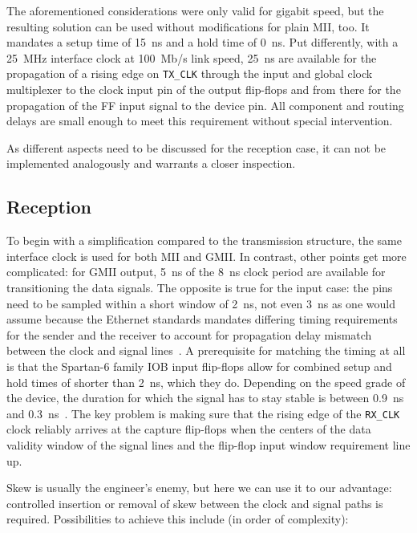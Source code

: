 \documentclass[a4paper, 11pt, oneside]{Thesis}  %
\begin{document}
The aforementioned considerations were only valid for gigabit speed, but the resulting solution can be used without modifications for plain MII, too. It mandates a setup time of 15~ns and a hold time of 0~ns. Put differently, with a 25~MHz interface clock at 100~Mb/s link speed, 25~ns are available for the propagation of a rising edge on \texttt{TX\_CLK} through the input and global clock multiplexer to the clock input pin of the output flip-flops and from there for the propagation of the FF input signal to the device pin. All component and routing delays are small enough to meet this requirement without special intervention.

As different aspects need to be discussed for the reception case, it can not be implemented analogously and warrants a closer inspection.

\subsection{Reception}

To begin with a simplification compared to the transmission structure, the same interface clock is used for both MII and GMII. In contrast, other points get more complicated: for GMII output, 5~ns of the 8~ns clock period are available for transitioning the data signals. The opposite is true for the input case: the pins need to be sampled within a short window of 2~ns, not even 3~ns as one would assume because the Ethernet standards mandates differing timing requirements for the sender and the receiver to account for propagation delay mismatch between the clock and signal lines~\cite{Ethernet}. A prerequisite for matching the timing at all is that the Spartan-6 family IOB input flip-flops allow for combined setup and hold times of shorter than 2~ns, which they do. Depending on the speed grade of the device, the duration for which the signal has to stay stable is between 0.9~ns and 0.3~ns~\cite{S6DS}. The key problem is making sure that the rising edge of the \texttt{RX\_CLK} clock reliably arrives at the capture flip-flops when the centers of the data validity window of the signal lines and the flip-flop input window requirement line up. 

Skew is usually the engineer's enemy, but here we can use it to our advantage: controlled insertion or removal of skew between the clock and signal paths is required. Possibilities to achieve this include (in order of complexity):
\end{document}
